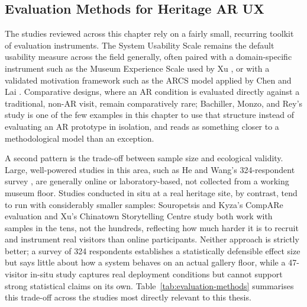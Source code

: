 \subsection{Evaluation Methods for Heritage AR UX}
\label{subsec:rw-evaluation}

The studies reviewed across this chapter rely on a fairly small, recurring
toolkit of evaluation instruments. The System Usability Scale remains the
default usability measure across the field generally, often paired with a
domain-specific instrument such as the Museum Experience Scale used by Xu
\cite{xu2026chinatown}, or with a validated motivation framework such as the
ARCS model applied by Chen and Lai \cite{chenlai2021}. Comparative designs,
where an AR condition is evaluated directly against a traditional, non-AR
visit, remain comparatively rare; Bachiller, Monzo, and Rey's study
\cite{bachiller2023} is one of the few examples in this chapter to use that
structure instead of evaluating an AR prototype in isolation, and reads as
something closer to a methodological model than an
exception.

A second pattern is the trade-off between sample size
and ecological validity. Large, well-powered studies in this area, such as
He and Wang's 324-respondent survey \cite{hewang2025}, are generally
online or laboratory-based, not collected from a working museum
floor. Studies conducted in situ at a real heritage site, by contrast, tend
to run with considerably smaller samples: Souropetsis and Kyza's CompARe
evaluation and Xu's Chinatown Storytelling Centre study
\cite{souropetsis2025,xu2026chinatown} both work with samples in the
tens, not the hundreds, reflecting how much harder it is to recruit
and instrument real visitors than online participants. Neither approach is
strictly better; a survey of 324 respondents establishes a statistically
defensible effect size but says little about how a system behaves on an
actual gallery floor, while a 47-visitor in-situ study captures real
deployment conditions but cannot support strong statistical claims on its
own. Table~\ref{tab:evaluation-methods} summarises this trade-off across the
studies most directly relevant to this thesis.

